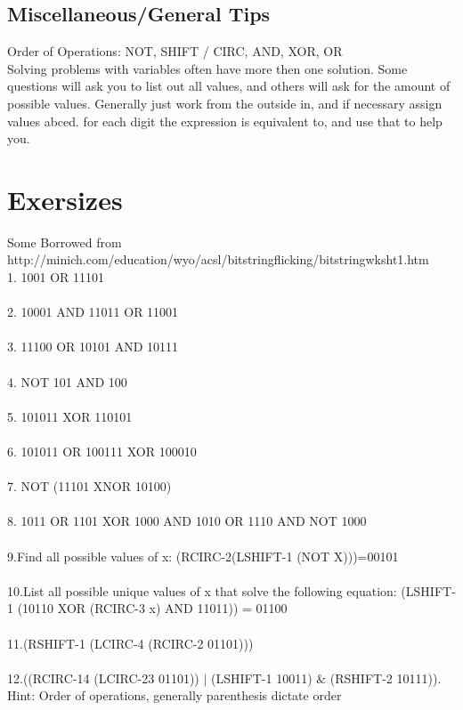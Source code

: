 \documentclass{article}
\begin{document}
\subsection{Miscellaneous/General Tips}
Order of Operations: NOT, SHIFT / CIRC, AND, XOR, OR
\\
Solving problems with variables often have more then one solution. Some questions will ask you to list out all values, and others will ask for the amount of possible values. Generally just work from the outside in, and if necessary assign values abced. for each digit the expression is equivalent to, and use that to help you.
\section{Exersizes}
Some Borrowed from http://minich.com/education/wyo/acsl/bitstringflicking/bitstringwksht1.htm
\\
 1. 1001 OR 11101
\\
\\
 2. 10001 AND 11011 OR 11001
\\
\\
3. 11100 OR 10101 AND 10111
\\
\\
 4. NOT 101 AND 100
\\
\\
 5. 101011 XOR 110101
\\
\\
 6. 101011 OR 100111 XOR 100010
\\
\\
 7. NOT (11101 XNOR 10100)
\\
\\
8. 1011 OR 1101 XOR 1000 AND 1010 OR 1110 AND NOT 1000
\\
\\
9.Find all possible values of x: (RCIRC-2(LSHIFT-1 (NOT X)))=00101
\\
\\
10.List all possible unique values of x that solve the following equation: (LSHIFT-1 (10110 XOR (RCIRC-3 x) AND 11011)) = 01100
\\
\\
11.(RSHIFT-1 (LCIRC-4 (RCIRC-2 01101)))
\\
\\
12.((RCIRC-14 (LCIRC-23 01101)) $\mid$ (LSHIFT-1 10011) $\&$ (RSHIFT-2 10111)). Hint: Order of operations, generally parenthesis dictate order
\enddocument
\end{document}

